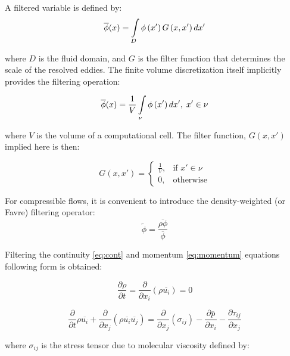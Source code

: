 A filtered variable is defined by:
\begin{equation} \label{eq:lesfilter}
\overline{\phi}(x) = \int\displaylimits_{D} \phi \left( x' \right) G \left( x, x' \right) dx'
\end{equation}

\noindent where $D$ is the fluid domain, and $G$ is the filter function that determines the scale of the resolved eddies. The finite volume discretization itself implicitly provides the filtering operation:

\begin{equation} \label{eq:lesfilter2}
\overline{\phi}(x) = \frac{1}{V} \int\displaylimits_{\nu} \phi \left( x' \right) dx', \; x' \in \nu
\end{equation}

\noindent where $V$ is the volume of a computational cell. The filter function, $G(x, x')$ implied here is then:

\begin{equation} \label{eq:lesfilter3}
G(x, x') = 
\begin{cases}
	\frac{1}{V}, & \text{if } x'\in \nu \\
	0, & \text{otherwise}
\end{cases}
\end{equation}

For compressible flows, it is convenient to introduce the density-weighted (or Favre) filtering operator:
\begin{equation} \label{eq:favre}
\tilde{\phi} = \frac{\overline{\rho \phi}}{\overline{\phi}}
\end{equation}

Filtering the continuity \ref{eq:cont} and momentum \ref{eq:momentum} equations following form is obtained:

\begin{equation} \label{eq:lescont}
\frac{\partial \rho}{\partial t} = \frac{\partial}{\partial x_i} \left( \rho \overline{u_i} \right) = 0
\end{equation}

\begin{equation} \label{eq:lesmom}
\frac{\partial}{\partial t} \rho \overline{u_i}
+ \frac{\partial}{\partial x_j} \left( \rho \overline{u_i} \overline{u_j} \right)
= \frac{\partial}{\partial x_j} \left( \sigma_{ij} \right)
- \frac{\partial \overline{p}}{\partial x_i}
- \frac{\partial \tau_{ij}}{\partial x_j}
\end{equation}

\noindent where $\sigma_{ij}$ is the stress tensor due to molecular viscosity defined by:

